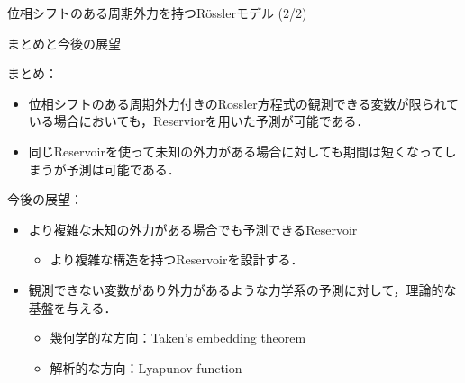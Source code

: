 \begin{frame}{位相シフトのある周期外力を持つRösslerモデル (2/2)}
    \begin{minipage}{0.4\textwidth}
        
    \end{minipage}
\end{frame}
\begin{frame}{まとめと今後の展望}        
    \begin{minipage}{0.5\textwidth}
        まとめ：
        \begin{itemize}
            \item 位相シフトのある周期外力付きのRossler方程式の観測できる変数が限られている場合においても，Reserviorを用いた予測が可能である．
            \item 同じReservoirを使って未知の外力がある場合に対しても期間は短くなってしまうが予測は可能である．
        \end{itemize}
        \end{minipage}
    \begin{minipage}{0.49\textwidth}
        今後の展望：
        \begin{itemize}
            \item より複雑な未知の外力がある場合でも予測できるReservoir \begin{itemize}
                \item より複雑な構造を持つReservoirを設計する．
            \end{itemize}
            \item 観測できない変数があり外力があるような力学系の予測に対して，理論的な基盤を与える．
            \begin{itemize}
                \item 幾何学的な方向：Taken's embedding theorem
                \item 解析的な方向：Lyapunov function
            \end{itemize}
        \end{itemize}
    \end{minipage}
\end{frame}
